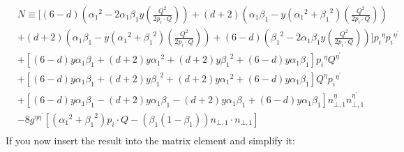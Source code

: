 \begin{equation}
\begin{split}
&N\equiv[(6-d)({\alpha_1}^2 -2\alpha_1 \beta_1 y(\frac{Q^2}{2 p_i \cdot Q}))+(d+2)({\alpha_1}\beta_1 -y({\alpha_1}^2 + {\beta_1}^2 )(\frac{Q^2}{2 p_i \cdot Q}))\\&+(d+2)({\alpha_1}\beta_1 -y({\alpha_1}^2 + {\beta_1}^2 )(\frac{Q^2}{2 p_i \cdot Q}))+(6-d)({\beta_1}^2 -2\alpha_1 \beta_1 y(\frac{Q^2}{2 p_i \cdot Q}))]{p_i}^{{\eta}}{p_i}^{{\eta}^{\prime}}\\
&+[(6-d)y\alpha_1 \beta_1+(d+2)y{\alpha_1}^2+(d+2)y{\beta_1}^2+(6-d)y\alpha_1 \beta_1] {p_i}^{{\eta}}{Q}^{{\eta}^{\prime}}\\
&+[(6-d)y\alpha_1 \beta_1 +(d+2)y{\beta_1}^2+(d+2)y{\alpha_1}^2+(6-d)y\alpha_1 \beta_1] {Q}^{{\eta}}{p_i}^{{\eta}^{\prime}}\\
&+[(6-d)y\alpha_1\beta_1-(d+2)y\alpha_1\beta_1-(d+2)y\alpha_1\beta_1+(6-d)y\alpha_1\beta_1] {n}^{{\eta}}_{\bot,1}{n}^{{\eta}^{\prime}}_{\bot,1}\\
&-8g^{{\eta}{{\eta}^{\prime}}}[({\alpha_1}^2+{\beta_1}^2) p_i \cdot Q - ({\beta_1}(1-\beta_1)){n}_{\bot,1}\cdot{n}_{\bot,1}]\\
\end{split}
\end{equation}
If you now insert the result into the matrix element and simplify it:



